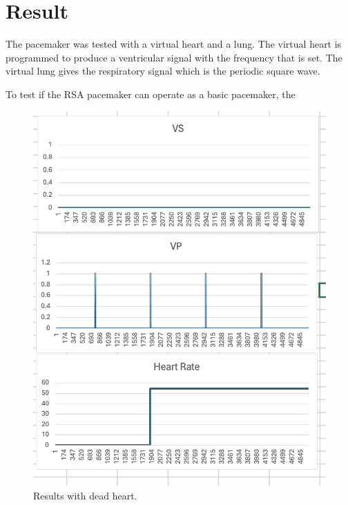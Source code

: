 \documentclass[conference]{IEEEtran}
\begin{document}
\section{Result}
The pacemaker was tested with a virtual heart and a lung. The virtual heart is programmed to produce a ventricular signal with the frequency that is set. The virtual lung gives the respiratory signal which is the periodic square wave.

To test if the RSA pacemaker can operate as a basic pacemaker, the 


\begin{figure}[htbp]
	\centerline{\includegraphics[scale=0.5]{./fig/result_dead.png}}
	\caption{Results with dead heart.}
	\label{lif}
\end{figure}
\end{document}
